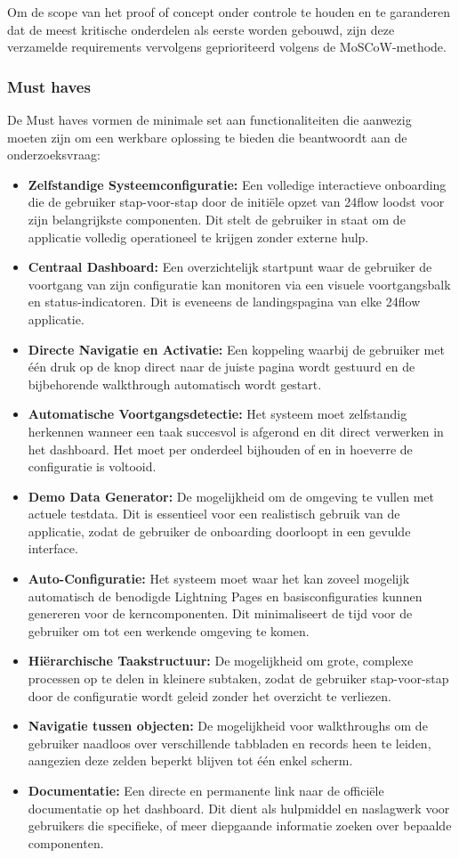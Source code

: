 Om de scope van het proof of concept onder controle te houden en te garanderen dat de meest kritische onderdelen als eerste worden gebouwd, zijn deze verzamelde requirements vervolgens geprioriteerd volgens de MoSCoW-methode.

\subsubsection{Must haves}
De Must haves vormen de minimale set aan functionaliteiten die aanwezig moeten zijn om een werkbare oplossing te bieden die beantwoordt aan de onderzoeksvraag:

\begin{itemize}
	\item \textbf{Zelfstandige Systeemconfiguratie:} Een volledige interactieve onboarding die de gebruiker stap-voor-stap door de initiële opzet van 24flow loodst voor zijn belangrijkste componenten. Dit stelt de gebruiker in staat om de applicatie volledig operationeel te krijgen zonder externe hulp.
	\item \textbf{Centraal Dashboard:} Een overzichtelijk startpunt waar de gebruiker de voortgang van zijn configuratie kan monitoren via een visuele voortgangsbalk en status-indicatoren. Dit is eveneens de landingspagina van elke 24flow applicatie.
	\item \textbf{Directe Navigatie en Activatie:} Een koppeling waarbij de gebruiker met één druk op de knop direct naar de juiste pagina wordt gestuurd en de bijbehorende  walkthrough automatisch wordt gestart.
	\item \textbf{Automatische Voortgangsdetectie:} Het systeem moet zelfstandig herkennen wanneer een taak succesvol is afgerond en dit direct verwerken in het dashboard. Het moet per onderdeel bijhouden of en in hoeverre de configuratie is voltooid.
	\item \textbf{Demo Data Generator:} De mogelijkheid om de omgeving te vullen met actuele testdata. Dit is essentieel voor een realistisch gebruik van de applicatie, zodat de gebruiker de onboarding doorloopt in een gevulde interface.
	\item \textbf{Auto-Configuratie:} Het systeem moet waar het kan zoveel mogelijk automatisch de benodigde Lightning Pages en basisconfiguraties kunnen genereren voor de kerncomponenten. Dit minimaliseert de tijd voor de gebruiker om tot een werkende omgeving te komen.
	\item \textbf{Hiërarchische Taakstructuur:} De mogelijkheid om grote, complexe processen op te delen in kleinere subtaken, zodat de gebruiker stap-voor-stap door de configuratie wordt geleid zonder het overzicht te verliezen.
	\item \textbf{Navigatie tussen objecten:} De mogelijkheid voor walkthroughs om de gebruiker naadloos over verschillende tabbladen en records heen te leiden, aangezien deze zelden beperkt blijven tot één enkel scherm.
	\item \textbf{Documentatie:} Een directe en permanente link naar de officiële documentatie op het dashboard. Dit dient als hulpmiddel en naslagwerk voor gebruikers die specifieke, of meer diepgaande informatie zoeken over bepaalde componenten.
\end{itemize}

